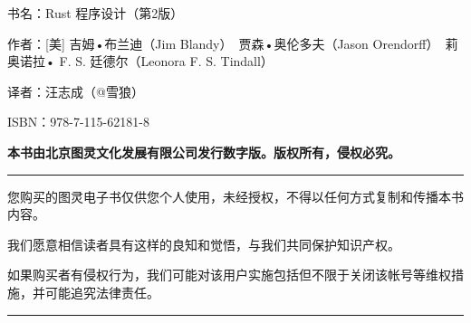 
书名：Rust 程序设计（第2版）

作者：[美] 吉姆•布兰迪（Jim Blandy）　贾森•奥伦多夫（Jason Orendorff）　莉奥诺拉• F. S. 廷德尔（Leonora F. S. Tindall）

译者：汪志成（@雪狼）

ISBN：978-7-115-62181-8

\textbf{本书由北京图灵文化发展有限公司发行数字版。版权所有，侵权必究。}

\par\noindent\rule{\textwidth}{0.4bp}\par

您购买的图灵电子书仅供您个人使用，未经授权，不得以任何方式复制和传播本书内容。

我们愿意相信读者具有这样的良知和觉悟，与我们共同保护知识产权。

如果购买者有侵权行为，我们可能对该用户实施包括但不限于关闭该帐号等维权措施，并可能追究法律责任。

\par\noindent\rule{\textwidth}{0.4bp}\par

